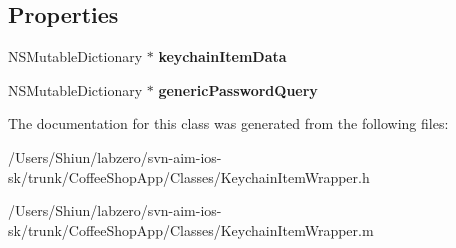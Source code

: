 \subsection*{Properties}
\begin{DoxyCompactItemize}
\item 
\hypertarget{interface_keychain_item_wrapper_ab70dc8af51dbc5f65eb2ba4183adc4b3}{
NSMutableDictionary $\ast$ {\bfseries keychainItemData}}
\label{interface_keychain_item_wrapper_ab70dc8af51dbc5f65eb2ba4183adc4b3}

\item 
\hypertarget{interface_keychain_item_wrapper_aec759568740866ef763be58bdd648c31}{
NSMutableDictionary $\ast$ {\bfseries genericPasswordQuery}}
\label{interface_keychain_item_wrapper_aec759568740866ef763be58bdd648c31}

\end{DoxyCompactItemize}


The documentation for this class was generated from the following files:\begin{DoxyCompactItemize}
\item 
/Users/Shiun/labzero/svn-\/aim-\/ios-\/sk/trunk/CoffeeShopApp/Classes/KeychainItemWrapper.h\item 
/Users/Shiun/labzero/svn-\/aim-\/ios-\/sk/trunk/CoffeeShopApp/Classes/KeychainItemWrapper.m\end{DoxyCompactItemize}
